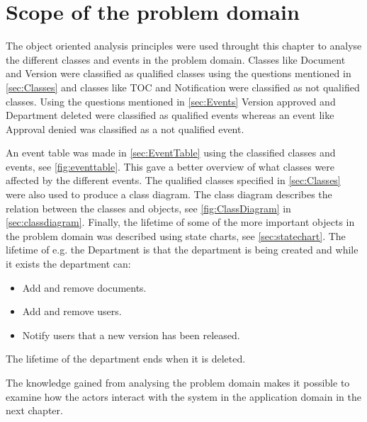\section{Scope of the problem domain}
The object oriented analysis principles were used throught this chapter to analyse the different classes and events in the problem domain.
Classes like Document and Version were classified as qualified classes using the questions mentioned in \cref{sec:Classes} and classes like TOC and Notification were classified as not qualified classes.
Using the questions mentioned in \cref{sec:Events} Version approved and Department deleted were classified as qualified events whereas an event like Approval denied was classified as a not qualified event.

An event table was made in \cref{sec:EventTable} using the classified classes and events, see \cref{fig:eventtable}.
This gave a better overview of what classes were affected by the different events.
The qualified classes specified in \cref{sec:Classes} were also used to produce a class diagram.
The class diagram describes the relation between the classes and objects, see \cref{fig:ClassDiagram} in \cref{sec:classdiagram}.
Finally, the lifetime of some of the more important objects in the problem domain was described using state charts, see \cref{sec:statechart}.
The lifetime of e.g. the Department is that the department is being created and while it exists the department can:

\begin{itemize}
	\item Add and remove documents.
	\item Add and remove users.
	\item Notify users that a new version has been released.
\end{itemize}

The lifetime of the department ends when it is deleted.

The knowledge gained from analysing the problem domain makes it possible to examine how the actors interact with the system in the application domain in the next chapter.

